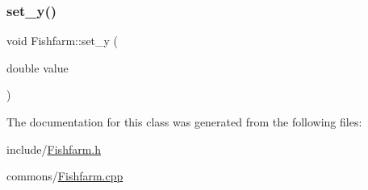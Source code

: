 \mbox{\label{class_fishfarm_acf2984bccb511f51e2f17e1ccd70355c}} 
\subsubsection{\texorpdfstring{set\_y()}{set\_y()}}
{\footnotesize\ttfamily void Fishfarm\+::set\+\_\+y (\begin{DoxyParamCaption}\item[{double}]{value }\end{DoxyParamCaption})}



The documentation for this class was generated from the following files\+:\begin{DoxyCompactItemize}
\item 
include/\mbox{\hyperlink{_fishfarm_8h}{Fishfarm.\+h}}\item 
commons/\mbox{\hyperlink{_fishfarm_8cpp}{Fishfarm.\+cpp}}\end{DoxyCompactItemize}

